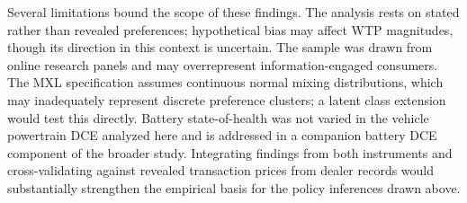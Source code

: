 \documentclass[a4paper,fleqn]{cas-sc}   %
\begin{document}
Several limitations bound the scope of these findings. The analysis rests on stated rather than revealed preferences; hypothetical bias may affect WTP magnitudes, though its direction in this context is uncertain. The sample was drawn from online research panels and may overrepresent information-engaged consumers. The MXL specification assumes continuous normal mixing distributions, which may inadequately represent discrete preference clusters; a latent class extension would test this directly. Battery state-of-health was not varied in the vehicle powertrain DCE analyzed here and is addressed in a companion battery DCE component of the broader study. Integrating findings from both instruments and cross-validating against revealed transaction prices from dealer records would substantially strengthen the empirical basis for the policy inferences drawn above.

\printcredits


\printbibliography
\end{document}
